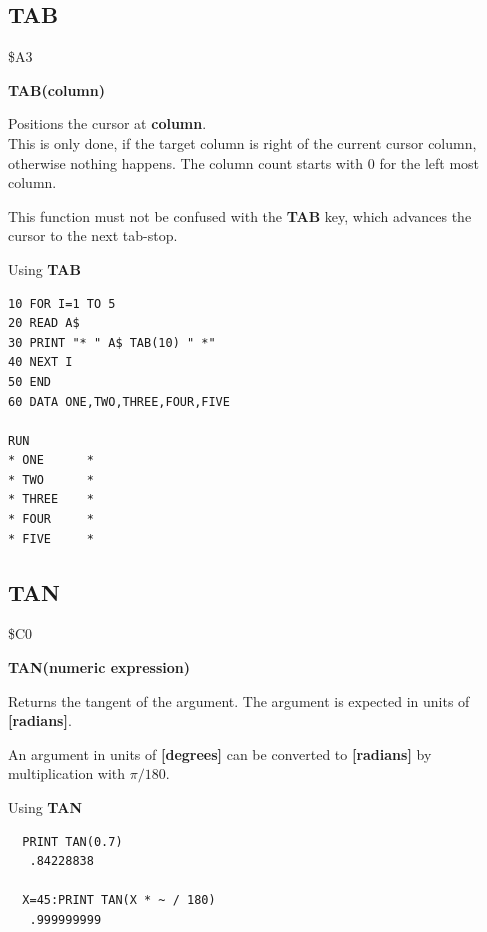 \subsection{TAB}
\begin{description}[leftmargin=2cm,style=nextline]
\item [Token:] \$A3
\item [Format:] {\bf TAB(column)}
\item [Usage:] Positions the cursor at {\bf column}. \\
               This is only done, if the target column is right
               of the current cursor column, otherwise nothing
               happens. The column count starts with 0 for the
               left most column.

\item [Remarks:] This function must not be confused with the
               {\bf TAB} key, which advances the cursor to the next
               tab-stop.

\item [Example:] Using {\bf TAB}
\begin{tcolorbox}[colback=black,coltext=white]
\verbatimfont{\codefont}
\begin{verbatim}
10 FOR I=1 TO 5
20 READ A$
30 PRINT "* " A$ TAB(10) " *"
40 NEXT I
50 END
60 DATA ONE,TWO,THREE,FOUR,FIVE

RUN
* ONE      *
* TWO      *
* THREE    *
* FOUR     *
* FIVE     *
\end{verbatim}
\end{tcolorbox}
\end{description}


\newpage
\subsection{TAN}
\begin{description}[leftmargin=2cm,style=nextline]
\item [Token:] \$C0
\item [Format:] {\bf TAN(numeric expression)}
\item [Usage:] Returns the tangent of the
               argument.
               The argument is expected in units of {\bf [radians]}.

\item [Remarks:] An argument in units of {\bf [degrees]}
                 can be converted to {\bf [radians]}
               by multiplication with $\pi/180$.
\item [Example:] Using {\bf TAN}
\begin{tcolorbox}[colback=black,coltext=white]
\verbatimfont{\codefont}
\begin{verbatim}
  PRINT TAN(0.7)
   .84228838

  X=45:PRINT TAN(X * ~ / 180)
   .999999999
\end{verbatim}
\end{tcolorbox}
\end{description}

